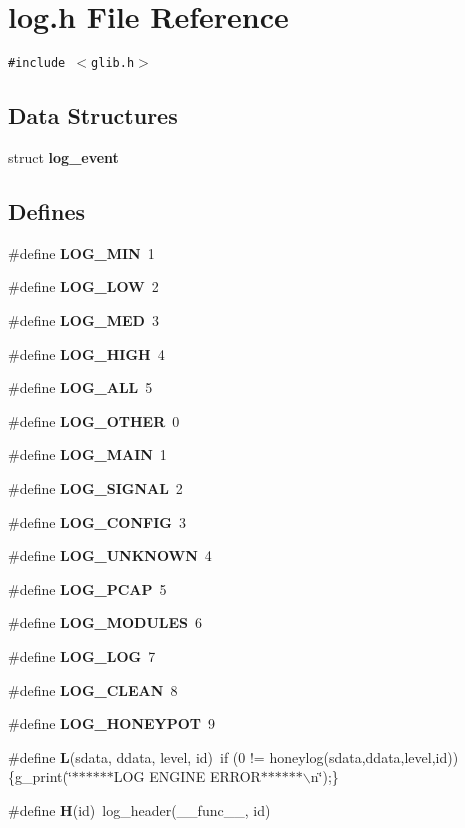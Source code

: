 \section{log.h File Reference}
\label{log_8h}
{\tt \#include $<$glib.h$>$}\par
\subsection*{Data Structures}
\begin{CompactItemize}
\item 
struct {\bf log\_\-event}
\end{CompactItemize}
\subsection*{Defines}
\begin{CompactItemize}
\item 
\#define {\bf LOG\_\-MIN}~1
\item 
\#define {\bf LOG\_\-LOW}~2
\item 
\#define {\bf LOG\_\-MED}~3
\item 
\#define {\bf LOG\_\-HIGH}~4
\item 
\#define {\bf LOG\_\-ALL}~5
\item 
\#define {\bf LOG\_\-OTHER}~0
\item 
\#define {\bf LOG\_\-MAIN}~1
\item 
\#define {\bf LOG\_\-SIGNAL}~2
\item 
\#define {\bf LOG\_\-CONFIG}~3
\item 
\#define {\bf LOG\_\-UNKNOWN}~4
\item 
\#define {\bf LOG\_\-PCAP}~5
\item 
\#define {\bf LOG\_\-MODULES}~6
\item 
\#define {\bf LOG\_\-LOG}~7
\item 
\#define {\bf LOG\_\-CLEAN}~8
\item 
\#define {\bf LOG\_\-HONEYPOT}~9
\item 
\#define {\bf L}(sdata, ddata, level, id)~if (0 != honeylog(sdata,ddata,level,id))\{g\_\-print(\char`\"{}$\ast$$\ast$$\ast$$\ast$$\ast$$\ast$LOG ENGINE ERROR$\ast$$\ast$$\ast$$\ast$$\ast$$\ast$$\backslash$n\char`\"{});\}
\item 
\#define {\bf H}(id)~log\_\-header(\_\-\_\-func\_\-\_\-, id)
\end{CompactItemize}
